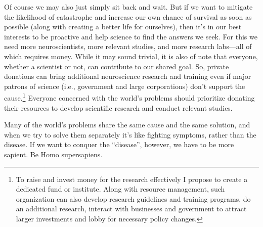 \documentclass[12pt]{report}
\begin{document}
\noindent Of course we may also just simply sit back and wait. But if we want to mitigate the likelihood of catastrophe and increase our own chance of survival as soon as possible (along with creating a better life for ourselves), then it’s in our best interests to be proactive and help science to find the answers we seek. For this we need more neuroscientists, more relevant studies, and more research labs\thinspace---\thinspace all of which requires money. While it may sound trivial, it is also of note that everyone, whether a scientist or not, can contribute to our shared goal. So, private donations can bring additional neuroscience research and training even if major patrons of science (i.e., government and large corporations) don’t support the cause.\footnote{To raise and invest money for the research effectively I propose to create a dedicated fund or institute. Along with resource management, such organization can also develop research guidelines and training programs, do an additional research, interact with businesses and government to attract larger investments and lobby for necessary policy changes.} Everyone concerned with the world’s problems should prioritize donating their resources to develop scientific research and conduct relevant studies.

\noindent Many of the world’s problems share the same cause and the same solution, and when we try to solve them separately it’s like fighting symptoms, rather than the disease. If we want to conquer the ``disease'', however, we have to be more sapient. Be Homo supersapiens.
\end{document}
